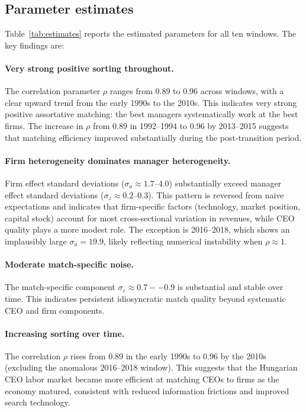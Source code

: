 \documentclass[11pt]{article}
\begin{document}
\subsection{Parameter estimates}
Table~\ref{tab:estimates} reports the estimated parameters for all ten windows. The key findings are:

\paragraph{Very strong positive sorting throughout.} The correlation parameter $\rho$ ranges from 0.89 to 0.96 across windows, with a clear upward trend from the early 1990s to the 2010s. This indicates very strong positive assortative matching: the best managers systematically work at the best firms. The increase in $\rho$ from 0.89 in 1992--1994 to 0.96 by 2013--2015 suggests that matching efficiency improved substantially during the post-transition period.

\paragraph{Firm heterogeneity dominates manager heterogeneity.} Firm effect standard deviations ($\sigma_a \approx 1.7$--4.0) substantially exceed manager effect standard deviations ($\sigma_z \approx 0.2$--0.3). This pattern is reversed from naive expectations and indicates that firm-specific factors (technology, market position, capital stock) account for most cross-sectional variation in revenues, while CEO quality plays a more modest role. The exception is 2016--2018, which shows an implausibly large $\sigma_a = 19.9$, likely reflecting numerical instability when $\rho \approx 1$.

\paragraph{Moderate match-specific noise.} The match-specific component $\sigma_\varepsilon \approx 0.7--0.9$ is substantial and stable over time. This indicates persistent idiosyncratic match quality beyond systematic CEO and firm components.

\paragraph{Increasing sorting over time.} The correlation $\rho$ rises from 0.89 in the early 1990s to 0.96 by the 2010s (excluding the anomalous 2016--2018 window). This suggests that the Hungarian CEO labor market became more efficient at matching CEOs to firms as the economy matured, consistent with reduced information frictions and improved search technology.
\end{document}
